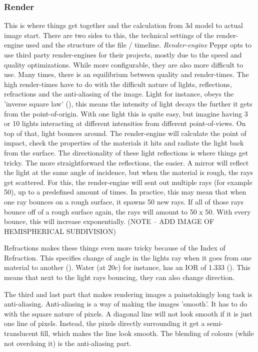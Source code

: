 \subsubsection{Render}
This is where things get together and the calculation from 3d model to actual image start. There are two sides to this, the technical settings of the render-engine used and the structure of the file / timeline.
\newline
\newline
\textit{Render-engine}
\newline
Peppr opts to use third party render-engines for their projects, mostly due to the speed and quality optimizations. While more configurable, they are also more difficult to use. Many times, there is an equilibrium between quality and render-times. The high render-times have to do with the difficult nature of lights, reflections, refractions and the anti-aliasing of the image. Light for instance, obeys the 'inverse square law' (\cite{inverseLightLaw}), this means the intensity of light decays the further it gets from the point-of-origin. With one light this is quite easy, but imagine having 3 or 10 lights interacting at different intensities from different point-of-views. On top of that, light bounces around. The render-engine will calculate the point of impact, check the properties of the materials it hits and radiate the light back from the surface. The directionality of these light reflections is where things get tricky. The more straightforward the reflections, the easier. A mirror will reflect the light at the same angle of incidence, but when the material is rough, the rays get scattered. For this, the render-engine will sent out multiple rays (for example 50), up to a predefined amount of times. In practice, this may mean that when one ray bounces on a rough surface, it spawns 50 new rays. If all of those rays bounce off of a rough surface again, the rays will amount to 50 x 50. With every bounce, this will increase exponentially.
(NOTE -- ADD IMAGE OF HEMISPHERICAL SUBDIVISION)

Refractions makes these things even more tricky because of the Index of Refraction. This specifies change of angle in the lights ray when it goes from one material to another (\cite{refractiveIndex}). Water (at 20c) for instance, has an IOR of 1.333 (\cite{waterIOR}). This means that next to the light rays bouncing, they can also change direction.

The third and last part that makes rendering images a painstakingly long task is anti-aliasing. Anti-aliasing is a way of making the images 'smooth'. It has to do with the square nature of pixels. A diagonal line will not look smooth if it is just one line of pixels. Instead, the pixels directly surrounding it get a semi-translucent fill, which makes the line look smooth. The blending of colours (while not overdoing it) is the anti-aliasing part.

